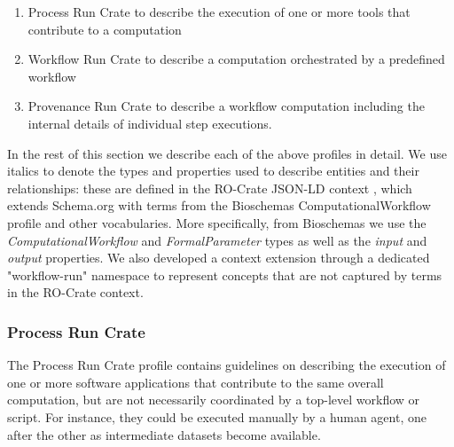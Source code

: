 \begin{enumerate}[(1)]
  \item Process Run Crate 
  \cite{WRROC 2023a} to describe the execution of one or more tools that contribute to a computation
  \item Workflow Run Crate 
  \cite{WRROC 2023b} to describe a computation orchestrated by a predefined workflow 
  \item Provenance Run Crate 
  \cite{WRROC 2023c} to describe a workflow computation including the internal details of individual step executions.
\end{enumerate}
  
In the rest of this section we describe each of the above profiles in detail.
We use italics to denote the types and properties used to describe entities and their relationships: these are defined in the RO-Crate JSON-LD context , which extends Schema.org with terms from the Bioschemas \cite{Gray 2017} ComputationalWorkflow profile  and other vocabularies. More specifically, from Bioschemas we use the \emph{ComputationalWorkflow} and \emph{FormalParameter} types as well as the \emph{input} and \emph{output} properties. We also developed a context extension through a dedicated "workflow-run" namespace  to represent concepts that are not captured by terms in the RO-Crate context.

\subsubsection{Process Run Crate}\label{ch54:process-run-crate}

The Process Run Crate profile contains guidelines on describing the execution of one or more software applications that contribute to the same overall computation, but are not necessarily coordinated by a top-level workflow or script.
For instance, they could be executed manually by a human agent, one after the other as intermediate datasets become available.

